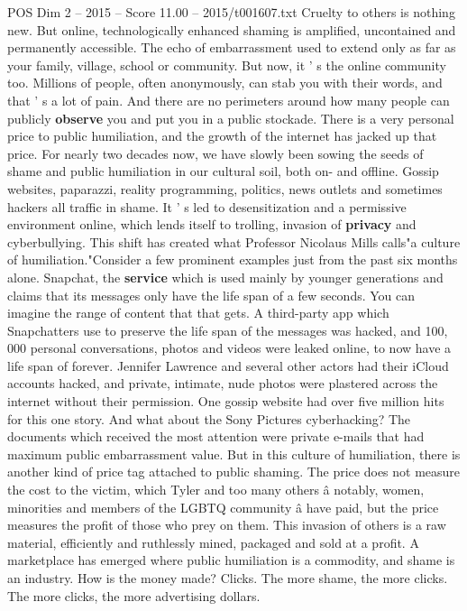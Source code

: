 \begin{textsample}{POS Dim 2 – 2015 – Score 11.00 – 2015/t001607.txt}
Cruelty to others is nothing new.
But online, technologically enhanced shaming is amplified, uncontained and permanently accessible.
The echo of embarrassment used to extend only as far as your family, village, school or community.
But now, it ' s the online community too.
Millions of people, often anonymously, can stab you with their words, and that ' s a lot of pain.
And there are no perimeters around how many people can publicly \textbf{observe} you and put you in a public stockade.
There is a very personal price to public humiliation, and the growth of the internet has jacked up that price.
For nearly two decades now, we have slowly been sowing the seeds of shame and public humiliation in our cultural soil, both on- and offline.
Gossip websites, paparazzi, reality programming, politics, news outlets and sometimes hackers all traffic in shame.
It ' s led to desensitization and a permissive environment online, which lends itself to trolling, invasion of \textbf{privacy} and cyberbullying.
This shift has created what Professor Nicolaus Mills calls"a culture of humiliation."Consider a few prominent examples just from the past six months alone.
Snapchat, the \textbf{service} which is used mainly by younger generations and claims that its messages only have the life span of a few seconds.
You can imagine the range of content that that gets.
A third-party app which Snapchatters use to preserve the life span of the messages was hacked, and 100, 000 personal conversations, photos and videos were leaked online, to now have a life span of forever.
Jennifer Lawrence and several other actors had their iCloud accounts hacked, and private, intimate, nude photos were plastered across the internet without their permission.
One gossip website had over five million hits for this one story.
And what about the Sony Pictures cyberhacking?
The documents which received the most attention were private e-mails that had maximum public embarrassment value.
But in this culture of humiliation, there is another kind of price tag attached to public shaming.
The price does not measure the cost to the victim, which Tyler and too many others â notably, women, minorities and members of the LGBTQ community â have paid, but the price measures the profit of those who prey on them.
This invasion of others is a raw material, efficiently and ruthlessly mined, packaged and sold at a profit.
A marketplace has emerged where public humiliation is a commodity, and shame is an industry.
How is the money made?
Clicks.
The more shame, the more clicks.
The more clicks, the more advertising dollars.

\end{textsample}
